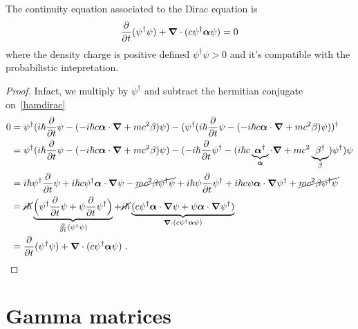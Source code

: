     The continuity equation associated to the Dirac equation is 
    \begin{equation*}
        \frac{\partial}{\partial t} (\psi^\dagger \psi) + \boldsymbol \nabla \cdot (c \psi^\dagger \boldsymbol \alpha \psi) = 0
    \end{equation*}
    where the density charge is positive defined $\psi^\dagger \psi > 0$ and it's compatible with the probabilistic intepretation.
    \begin{proof}
        Infact, we multiply by $\psi^\dagger$ and subtract the hermitian conjugate on~\eqref{hamdirac} 
        \begin{equation*}
        \begin{aligned}
            0 & = \psi^\dagger (i \hbar \frac{\partial}{\partial t} \psi - (- i \hbar c \boldsymbol \alpha \cdot \boldsymbol \nabla + m c^2 \beta) \psi) - (\psi^\dagger (i \hbar \frac{\partial}{\partial t} \psi - (- i \hbar c \boldsymbol \alpha \cdot \boldsymbol \nabla + m c^2 \beta) \psi))^\dagger \\ & = \psi^\dagger (i \hbar \frac{\partial}{\partial t} \psi - (- i \hbar c \boldsymbol \alpha \cdot \boldsymbol \nabla + m c^2 \beta) \psi) - (- i \hbar \frac{\partial}{\partial t} \psi^\dagger - (i \hbar c \underbrace{\boldsymbol \alpha^\dagger}_{\boldsymbol \alpha} \cdot \boldsymbol \nabla + m c^2 \underbrace{\beta^\dagger}_\beta) \psi^\dagger) \psi \\ & = i \hbar \psi^\dagger \frac{\partial}{\partial t} \psi + i \hbar c \psi^\dagger \boldsymbol \alpha \cdot \boldsymbol \nabla \psi - \cancel{m c^2 \beta \psi^\dagger \psi }+ i \hbar \psi \frac{\partial}{\partial t} \psi^\dagger + i \hbar c \psi \boldsymbol \alpha \cdot \boldsymbol \nabla \psi^\dagger + \cancel{m c^2 \beta \psi^\dagger \psi} \\ & = \cancel{i \hbar} \underbrace{\Big( \psi^\dagger \frac{\partial}{\partial t} \psi + \psi \frac{\partial}{\partial t} \psi^\dagger \Big)}_{\frac{\partial}{\partial t} (\psi^\dagger \psi)} + \cancel{i \hbar} \underbrace{(c \psi^\dagger \boldsymbol \alpha \cdot \boldsymbol \nabla \psi  + \psi \boldsymbol \alpha \cdot \boldsymbol \nabla \psi^\dagger)}_{\boldsymbol \nabla \cdot (c \psi^\dagger \boldsymbol \alpha \psi)} \\ & = \frac{\partial}{\partial t} (\psi^\dagger \psi) + \boldsymbol \nabla \cdot (c \psi^\dagger \boldsymbol \alpha \psi)  ~.
        \end{aligned}
        \end{equation*}
    \end{proof}

\section{Gamma matrices}


